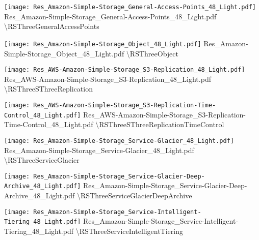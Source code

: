  {\texttt{[image: Res\_Amazon-Simple-Storage\_General-Access-Points\_48\_Light.pdf]}} {Res\_Amazon-Simple-Storage\_General-Access-Points\_48\_Light.pdf} {{\textbackslash}RSThreeGeneralAccessPoints}

 {\texttt{[image: Res\_Amazon-Simple-Storage\_Object\_48\_Light.pdf]}} {Res\_Amazon-Simple-Storage\_Object\_48\_Light.pdf} {{\textbackslash}RSThreeObject}

 {\texttt{[image: Res\_AWS-Amazon-Simple-Storage\_S3-Replication\_48\_Light.pdf]}} {Res\_AWS-Amazon-Simple-Storage\_S3-Replication\_48\_Light.pdf} {{\textbackslash}RSThreeSThreeReplication}

 {\texttt{[image: Res\_AWS-Amazon-Simple-Storage\_S3-Replication-Time-Control\_48\_Light.pdf]}} {Res\_AWS-Amazon-Simple-Storage\_S3-Replication-Time-Control\_48\_Light.pdf} {{\textbackslash}RSThreeSThreeReplicationTimeControl}

 {\texttt{[image: Res\_Amazon-Simple-Storage\_Service-Glacier\_48\_Light.pdf]}} {Res\_Amazon-Simple-Storage\_Service-Glacier\_48\_Light.pdf} {{\textbackslash}RSThreeServiceGlacier}

 {\texttt{[image: Res\_Amazon-Simple-Storage\_Service-Glacier-Deep-Archive\_48\_Light.pdf]}} {Res\_Amazon-Simple-Storage\_Service-Glacier-Deep-Archive\_48\_Light.pdf} {{\textbackslash}RSThreeServiceGlacierDeepArchive}

 {\texttt{[image: Res\_Amazon-Simple-Storage\_Service-Intelligent-Tiering\_48\_Light.pdf]}} {Res\_Amazon-Simple-Storage\_Service-Intelligent-Tiering\_48\_Light.pdf} {{\textbackslash}RSThreeServiceIntelligentTiering}


